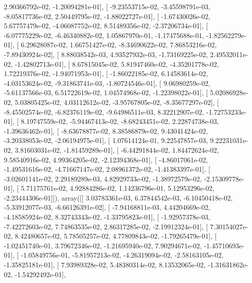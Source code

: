\documentclass{article}
\begin{document}
          2.90366792e-02,  -1.20094281e-01],
       [ -9.23553715e-02,  -3.45598791e-03,  -8.05817736e-02,
          2.50449795e-02,  -1.88022727e-01],
       [ -1.67430026e-02,   5.67757479e-02,  -4.06087752e-02,
          8.51489356e-02,  -2.37206734e-01],
       [ -6.07775229e-02,  -6.46340882e-02,   1.05867970e-01,
         -1.17475688e-01,  -1.82562279e-01],
       [  6.29628087e-02,   1.66751427e-02,  -8.34690622e-02,
          7.86853216e-02,  -7.89430924e-02],
       [  8.88038542e-03,   4.93527932e-03,  -1.73169225e-02,
          2.49532011e-02,  -1.42802713e-01],
       [  8.67815045e-02,   5.81947460e-02,  -4.35201778e-02,
          1.72219376e-02,  -1.94071953e-01],
       [ -1.86022185e-02,   6.14583614e-02,  -4.03153624e-02,
         -9.31863741e-03,  -1.80724546e-01],
       [  9.06980259e-02,  -5.61137566e-03,   6.51722619e-02,
          1.04574968e-02,  -1.22398022e-01],
       [  5.02086928e-02,   5.03805425e-02,   4.03112612e-02,
         -3.95767805e-02,  -8.35677297e-02],
       [ -8.45502574e-02,  -6.82376119e-02,  -9.64986511e-03,
          8.32212907e-02,  -1.72753233e-01],
       [  8.19747559e-02,  -5.94467413e-02,  -8.68243451e-02,
          2.22874738e-03,  -1.39636462e-01],
       [ -8.63678877e-02,   8.38586879e-02,   9.43041424e-02,
         -3.20338053e-02,  -2.06194975e-01],
       [  1.07614124e-01,   9.22547857e-03,   9.22231031e-02,
          3.81603031e-02,  -1.81459289e-01],
       [ -6.44291844e-02,   1.84472624e-02,   9.58540916e-02,
          4.99364205e-02,  -2.12394368e-01],
       [ -4.86017061e-02,  -1.49531616e-02,  -4.71667147e-02,
          2.08961372e-02,  -1.41383397e-01],
       [ -3.02601141e-02,   2.29189289e-03,   4.82929733e-02,
         -1.38972579e-02,  -2.15309778e-01],
       [  5.71175761e-02,   4.92884286e-02,   1.14236796e-01,
          5.12953296e-02,  -2.23444306e-01]]), array([[  3.03783361e-03,   6.37844542e-03,  -6.10450418e-02,
         -5.33912077e-03,  -6.66126391e-02],
       [ -7.94168811e-03,   4.44204669e-02,  -4.18585924e-02,
          8.32743343e-02,  -1.33795823e-01],
       [ -1.92957378e-03,  -7.42272603e-02,   7.74863535e-02,
          2.86317285e-02,  -2.19912324e-01],
       [  7.30154027e-02,   8.42480657e-02,   5.78505257e-02,
          4.77809843e-02,  -1.79265479e-01],
       [ -1.02451740e-01,   3.79672346e-02,  -1.21695940e-02,
          7.90294671e-02,  -1.45710693e-01],
       [ -1.05849756e-01,  -5.81957213e-02,  -4.26319094e-02,
         -2.58163105e-02,  -1.35825181e-01],
       [  7.93989328e-02,   5.48380314e-02,   8.13532065e-02,
         -1.31631862e-02,  -1.54292492e-01],
\end{document}
